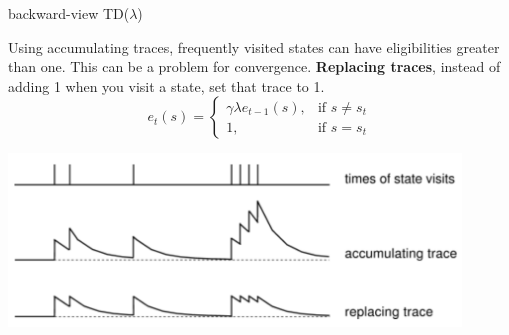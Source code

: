 \documentclass[main.tex]{subfiles}
\begin{document}
\newline
\begin{algorithm}[H]
    \SetAlgoLined


    \caption{backward-view TD($\lambda$)}
\end{algorithm}
\par
\noindent
Using accumulating traces, frequently visited states can have eligibilities greater than one. This can be a problem for convergence. \textbf{Replacing traces}, instead of adding 1 when you visit a state, set that trace to 1.
\begin{equation}
    e_t(s) =
    \begin{cases}
        \gamma \lambda e_{t-1}(s), & \text{if }s \neq s_t \\
        1,                         & \text{if }s=s_t
    \end{cases}
\end{equation}
\begin{center}
    \includegraphics[width=120mm]{img/EligibilityTracesRepleacing.png}
\end{center}
\newpage
\end{document}

